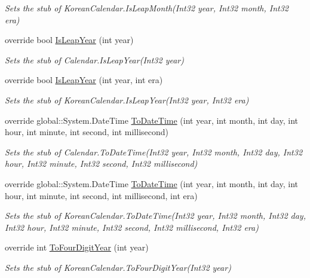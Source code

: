 \begin{DoxyCompactItemize}
\begin{DoxyCompactList}\small\item\em Sets the stub of Korean\-Calendar.\-Is\-Leap\-Month(\-Int32 year, Int32 month, Int32 era)\end{DoxyCompactList}\item 
override bool \hyperlink{class_system_1_1_globalization_1_1_fakes_1_1_stub_korean_calendar_aa7c5a9c3977197c1db308a9d502d6461}{Is\-Leap\-Year} (int year)
\begin{DoxyCompactList}\small\item\em Sets the stub of Calendar.\-Is\-Leap\-Year(\-Int32 year)\end{DoxyCompactList}\item 
override bool \hyperlink{class_system_1_1_globalization_1_1_fakes_1_1_stub_korean_calendar_a034021c427297e3dbcf4f9abc2b2fecc}{Is\-Leap\-Year} (int year, int era)
\begin{DoxyCompactList}\small\item\em Sets the stub of Korean\-Calendar.\-Is\-Leap\-Year(\-Int32 year, Int32 era)\end{DoxyCompactList}\item 
override global\-::\-System.\-Date\-Time \hyperlink{class_system_1_1_globalization_1_1_fakes_1_1_stub_korean_calendar_a61137880931d1bf4735314e27088ecf8}{To\-Date\-Time} (int year, int month, int day, int hour, int minute, int second, int millisecond)
\begin{DoxyCompactList}\small\item\em Sets the stub of Calendar.\-To\-Date\-Time(\-Int32 year, Int32 month, Int32 day, Int32 hour, Int32 minute, Int32 second, Int32 millisecond)\end{DoxyCompactList}\item 
override global\-::\-System.\-Date\-Time \hyperlink{class_system_1_1_globalization_1_1_fakes_1_1_stub_korean_calendar_aea07189f831f1a33c97fe8248fc960c1}{To\-Date\-Time} (int year, int month, int day, int hour, int minute, int second, int millisecond, int era)
\begin{DoxyCompactList}\small\item\em Sets the stub of Korean\-Calendar.\-To\-Date\-Time(\-Int32 year, Int32 month, Int32 day, Int32 hour, Int32 minute, Int32 second, Int32 millisecond, Int32 era)\end{DoxyCompactList}\item 
override int \hyperlink{class_system_1_1_globalization_1_1_fakes_1_1_stub_korean_calendar_afc625cc5b8b4a853dd91f651f4be73ba}{To\-Four\-Digit\-Year} (int year)
\begin{DoxyCompactList}\small\item\em Sets the stub of Korean\-Calendar.\-To\-Four\-Digit\-Year(\-Int32 year)\end{DoxyCompactList}\end{DoxyCompactItemize}
